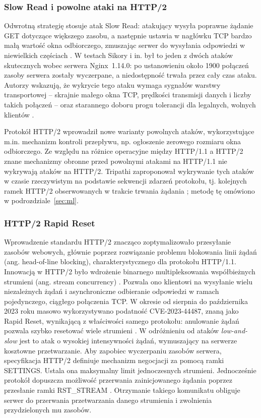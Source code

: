 \documentclass[a4paper,12pt]{article}
\begin{document}
\subsubsection{Slow Read i powolne ataki na HTTP/2}
Odwrotną strategię stosuje atak Slow Read: atakujący wysyła poprawne żądanie GET dotyczące większego zasobu, a następnie ustawia w nagłówku TCP bardzo małą wartość okna odbiorczego, zmuszając serwer do wysyłania odpowiedzi w niewielkich częściach \cite{sikora2021generator}. W testach Sikory i in. był to jeden z dwóch ataków skutecznych wobec serwera Nginx~1.14.0: po ustanowieniu około 1900 połączeń zasoby serwera zostały wyczerpane, a niedostępność trwała przez cały czas ataku. Autorzy wskazują, że wykrycie tego ataku wymaga sygnałów warstwy transportowej -- skrajnie małego okna TCP, prędkości transmisji danych i liczby takich połączeń -- oraz starannego doboru progu tolerancji dla legalnych, wolnych klientów \cite{sikora2021generator}.

Protokół HTTP/2 wprowadził nowe warianty powolnych ataków, wykorzystujące m.in. mechanizm kontroli przepływu, np. ogłoszenie zerowego rozmiaru okna odbiorczego. Ze względu na różnice operacyjne między HTTP/1.1 a HTTP/2 znane mechanizmy obronne przed powolnymi atakami na HTTP/1.1 nie wykrywają ataków na HTTP/2. Tripathi zaproponował wykrywanie tych ataków w czasie rzeczywistym na podstawie sekwencji zdarzeń protokołu, tj. kolejnych ramek HTTP/2 obserwowanych w trakcie trwania żądania \cite{tripathi2024delays}; metodę tę omówiono w podrozdziale~\ref{sec:ml}.
\subsubsection{HTTP/2 Rapid Reset}
Wprowadzenie standardu HTTP/2 znacząco zoptymalizowało przesyłanie zasobów webowych, głównie poprzez rozwiązanie problemu blokowania linii żądań (ang. head-of-line blocking), charakterystycznego dla protokołu HTTP/1.1. Innowacją w HTTP/2 było wdrożenie binarnego multipleksowania współbieżnych strumieni (ang. stream concurrency) \cite{rfc9113}. Pozwala ono klientowi na wysyłanie wielu niezależnych żądań i asynchroniczne odbieranie odpowiedzi w ramach pojedynczego, ciągłego połączenia TCP. W okresie od sierpnia do października 2023 roku masowo wykorzystywano podatność CVE-2023-44487, znaną jako Rapid Reset, wynikającą z właściwości samego protokołu: anulowanie żądań pozwala szybko resetować wiele strumieni \cite{nvd2023cve44487}. W odróżnieniu od ataków \textit{low-and-slow} jest to atak o wysokiej intensywności żądań, wymuszający na serwerze kosztowne przetwarzanie.
Aby zapobiec wyczerpaniu zasobów serwera, specyfikacja HTTP/2 definiuje mechanizm negocjacji za pomocą ramki SETTINGS. Ustala ona maksymalny limit jednoczesnych strumieni. Jednocześnie protokół dopuszcza możliwość przerwania zainicjowanego żądania poprzez przesłanie ramki RST\_STREAM \cite{rfc9113}. Otrzymanie takiego komunikatu obliguje serwer do przerwania przetwarzania danego strumienia i zwolnienia przydzielonych mu zasobów.
\end{document}
